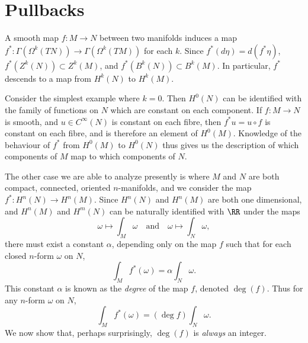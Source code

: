 \section{Pullbacks}

A smooth map $f: M \to N$ between two manifolds induces a map $f^*: \Gamma(\Omega^k(TN)) \to \Gamma(\Omega^k(TM))$ for each $k$. Since $f^*(d\eta) = d(f^* \eta)$, $f^*(Z^k(N)) \subset Z^k(M)$, and $f^*(B^k(N)) \subset B^k(M)$. In particular, $f^*$ descends to a map from $H^k(N)$ to $H^k(M)$.

\begin{example}
    Consider the simplest example where $k = 0$. Then $H^0(N)$ can be identified with the family of functions on $N$ which are constant on each component. If $f: M \to N$ is smooth, and $u \in C^\infty(N)$ is constant on each fibre, then $f^* u = u \circ f$ is constant on each fibre, and is therefore an element of $H^0(M)$. Knowledge of the behaviour of $f^*$ from $H^0(M)$ to $H^0(N)$ thus gives us the description of which components of $M$ map to which components of $N$.
\end{example}

The other case we are able to analyze presently is where $M$ and $N$ are both compact, connected, oriented $n$-manifolds, and we consider the map $f^*: H^n(N) \to H^n(M)$. Since $H^n(N)$ and $H^n(M)$ are both one dimensional, and $H^n(M)$ and $H^m(N)$ can be naturally identified with $\RR$ under the maps
%
\[ \omega \mapsto \int_M \omega \quad\text{and}\quad \omega \mapsto \int_N \omega, \]
%
there must exist a constant $\alpha$, depending only on the map $f$ such that for each closed $n$-form $\omega$ on $N$,
%
\[ \int_M f^*(\omega) = \alpha \int_N \omega. \]
%
This constant $\alpha$ is known as the \emph{degree} of the map $f$, denoted $\deg(f)$. Thus for any $n$-form $\omega$ on $N$,
%
\[ \int_M f^*(\omega) = (\deg f) \int_N \omega. \]
%
We now show that, perhaps surprisingly, $\deg(f)$ is \emph{always} an integer.

